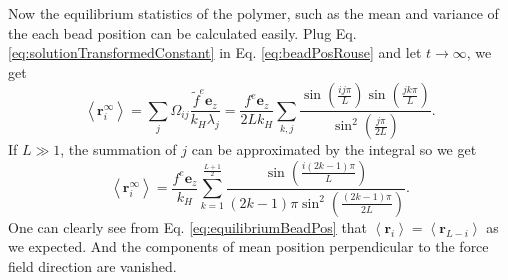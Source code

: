 Now the equilibrium statistics of the polymer, such as the mean and variance of the each bead position can be calculated easily. Plug Eq.  \eqref{eq:solutionTransformedConstant} in Eq.  \eqref{eq:beadPosRouse} and let $t\rightarrow\infty$, we get 
\begin{equation}
    \label{eq:equilibriumBeadPosRaw}
    \left<\mathbf{r}_i^\infty\right> = \sum_j \Omega_{ij}
    \frac{\tilde{f}^e\mathbf{e}_z}{k_H \lambda_j} =
    \frac{f^e\mathbf{e}_z}{2 L k_H}\sum_{k,j}
    \frac{\sin\left(\frac{ij\pi}{L}\right)\sin\left(\frac{jk\pi}{L}\right)}
    {\sin^2\left(\frac{j\pi}{2L}\right)}.
\end{equation}
If $L\gg 1$, the summation of $j$ can be approximated by the integral so we get
\begin{equation}
    \label{eq:equilibriumBeadPos}
    \left<\mathbf{r}_i^\infty\right> = 
    \frac{f^e\mathbf{e}_z}{k_H} \sum_{k=1}^{\frac{L+1}{2}}\frac{\sin\left(\frac{i(2k-1)\pi}{L}\right)} {(2k-1)\pi\sin^2\left(\frac{(2k-1)\pi}{2L}\right)}.
\end{equation}
One can clearly see from Eq. \eqref{eq:equilibriumBeadPos} that $\left<\mathbf{r}_i\right> = \left<\mathbf{r}_{L-i}\right>$ as we expected. And the components of mean position perpendicular to the force field direction are vanished. 

